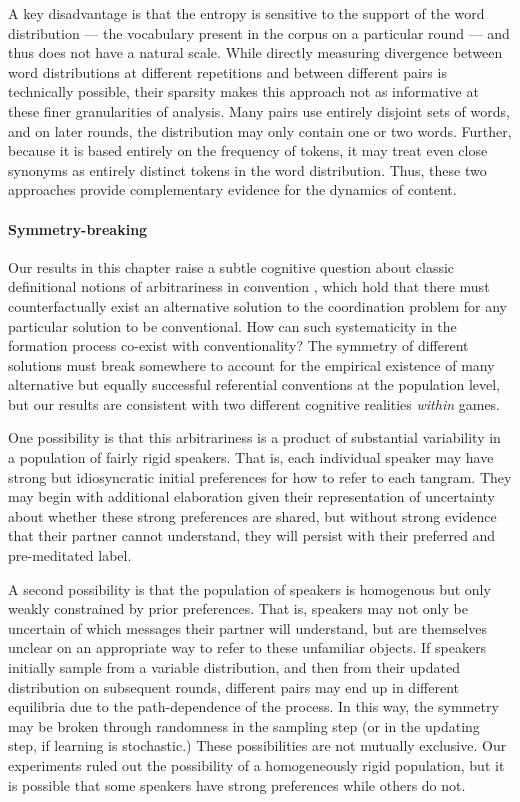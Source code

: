 \documentclass[alpha-refs]{wiley-article}
\begin{document}
A key disadvantage is that the entropy is sensitive to the support of the word distribution --- the vocabulary present in the corpus on a particular round --- and thus does not have a natural scale.
While directly measuring divergence between word distributions at different repetitions and between different pairs is technically possible, their sparsity makes this approach not as informative at these finer granularities of analysis.
Many pairs use entirely disjoint sets of words, and on later rounds, the distribution may only contain one or two words. 
Further, because it is based entirely on the frequency of tokens, it may treat even close synonyms as entirely distinct tokens in the word distribution. 
Thus, these two approaches provide complementary evidence for the dynamics of content.

\paragraph{Symmetry-breaking}
Our results in this chapter raise a subtle cognitive question about classic definitional notions of arbitrariness in convention \citep{Lewis69_Convention}, which hold that there must counterfactually exist an alternative solution to the coordination problem for any particular solution to be conventional.
How can such systematicity in the formation process co-exist with conventionality?
The symmetry of different solutions must break somewhere to account for the empirical existence of many alternative but equally successful referential conventions at the population level, but our results are consistent with two different cognitive realities \emph{within} games.

One possibility is that this arbitrariness is a product of substantial variability in a population of fairly rigid speakers.
That is, each individual speaker may have strong but idiosyncratic initial preferences for how to refer to each tangram. 
They may begin with additional elaboration given their representation of uncertainty about whether these strong preferences are shared, but without strong evidence that their partner cannot understand, they will persist with their preferred and pre-meditated label.

A second possibility is that the population of speakers is homogenous but only weakly constrained by prior preferences. 
That is, speakers may not only be uncertain of which messages their partner will understand, but are themselves unclear on an appropriate way to refer to these unfamiliar objects.
If speakers initially sample from a variable distribution, and then from their updated distribution on subsequent rounds, different pairs may end up in different equilibria due to the path-dependence of the process. 
In this way, the symmetry may be broken through randomness in the sampling step (or in the updating step, if learning is stochastic.)
These possibilities are not mutually exclusive.
Our experiments ruled out the possibility of a homogeneously rigid population, but it is possible that some speakers have strong preferences while others do not.
\end{document}
